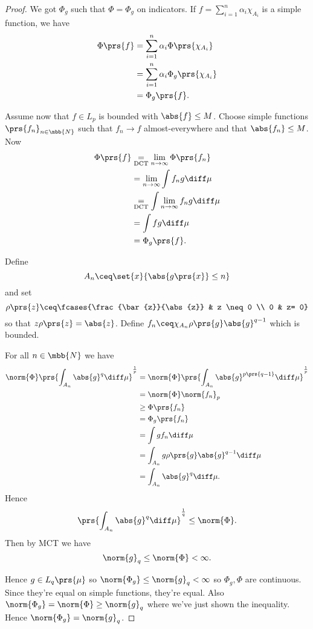 \documentclass[10pt, twoside]{book}
\begin{document}
\begin{proof}
We got $\Phi_g$ such that $\Phi = \Phi_g$ on indicators.
If $f = \sum_{i=1}^n \alpha_i \chi_{A_i}$ is a simple function, we have
\begin{align*}
\Phi\prs{f} &= \sum_{i=1}^n \alpha_i \Phi\prs{\chi_{A_i}}
\\&= \sum_{i=1}^n \alpha_i \Phi_g\prs{\chi_{A_i}}
\\&= \Phi_g\prs{f} \text{.}
\end{align*}

Assume now that $f \in L_p$ is bounded with $\abs{f} \leq M$.
Choose simple functions $\prs{f_n}_{n \in \mbb{N}}$ such that $f_n \to f$ almost-everywhere and that $\abs{f_n} \leq M$.
Now
\begin{align*}
\Phi\prs{f} &\underset{\text{DCT}}{=} \lim_{n \to \infty} \Phi\prs{f_n}
\\&=
\lim_{n \to \infty} \int f_n g \diff \mu
\\&\underset{\text{DCT}}{=}
\int \lim_{n \to \infty} f_n g \diff \mu
\\&=
\int fg \diff \mu
\\&=
\Phi_g\prs{f} \text{.}
\end{align*}

Define
\[A_n \ceq \set{x}{\abs{g\prs{x}} \leq n}\]
and set
\[\rho\prs{z} \ceq \fcases{\frac{\bar{z}}{\abs{z}} & z \neq 0 \\ 0 & z= 0}\]
so that $z \rho\prs{z} = \abs{z}$.
Define $f_n \ceq \chi_{A_n} \rho\prs{g} \abs{g}^{q-1}$ which is bounded.

For all $n \in \mbb{N}$ we have
\begin{align*}
\norm{\Phi} \prs{\int_{A_n} \abs{g}^{q} \diff \mu}^{\frac{1}{p}}
&=
\norm{\Phi} \prs{\int_{A_n} \abs{g}^{p\prs{q-1}} \diff \mu}^{\frac{1}{p}}
\\&=
\norm{\Phi} \norm{f_n}_p
\\&\geq
\Phi \prs{f_n}
\\&=
\Phi_g\prs{f_n}
\\&=
\int g f_n \diff \mu
\\&=
\int_{A_n} g \rho\prs{g} \abs{g}^{q-1} \diff \mu
\\&=
\int_{A_n} \abs{g}^q \diff \mu \text{.}
\end{align*}
Hence
\[\prs{\int_{A_n} \abs{g}^q \diff \mu}^{\frac{1}{q}} \leq \norm{\Phi} \text{.}\]
Then by MCT we have
\[\norm{g}_q \leq \norm{\Phi} < \infty \text{.}\]

Hence $g \in L_q\prs{\mu}$ so $\norm{\Phi_g} \leq \norm{g}_q < \infty$ so $\Phi_g, \Phi$ are continuous. Since they're equal on simple functions, they're equal. Also $\norm{\Phi_g} = \norm{\Phi} \geq \norm{g}_q$ where we've just shown the inequality. Hence $\norm{\Phi_g} = \norm{g}_q$.
\end{proof}
\end{document}
